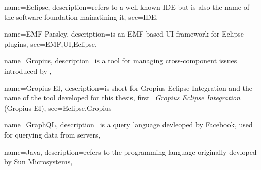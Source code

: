 
{
	name=Eclipse,
	description={refers to a well known IDE but is also the name of the software foundation mainatining it},
	see={IDE},
}



{
	name={EMF Parsley},
	description={is an EMF based UI framework for Eclipse plugins},
	see={EMF,UI,Eclipse},
}

{
	name=Gropius,
	description={is a tool for managing cross-component issues introduced by \cite{speth2020gropius}},
}


{
	name=Gropius EI,
	description={is short for Gropius Eclipse Integration and the name of the tool developed for this thesis},
	first={\emph{Gropius Eclipse Integration} (Gropius EI)},
	see={Eclipse,Gropius}
}

{
	name=GraphQL,
	description={is a query language devleoped by Facebook, used for querying data from servers},
}

{
	name=Java,
	description={refers to the programming language originally devloped by Sun Microsystems},
}
